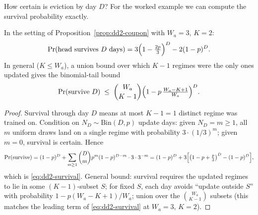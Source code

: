 How certain is eviction by day $D$? For the worked example we can compute the
survival probability exactly.

\begin{proposition}
\label{prop:dd2-survival}
In the setting of Proposition~\ref{prop:dd2-coupon} with $W_a = 3$, $K = 2$:
\begin{equation}
\label{eq:dd2-survival}
\Pr(\text{head survives } D \text{ days})
= 3\Bigl(1 - \tfrac{2p}{3}\Bigr)^{D} - 2(1 - p)^{D}.
\end{equation}
In general ($K \le W_a$), a union bound over which $K-1$ regimes were the
only ones updated gives the binomial-tail bound
\[
\Pr(\text{survive } D)
\;\le\; \binom{W_a}{K-1}
\Bigl(1 - p\,\tfrac{W_a - K + 1}{W_a}\Bigr)^{D}.
\]
\end{proposition}

\begin{proof}
Survival through day $D$ means at most $K - 1 = 1$ distinct regime was
trained on. Condition on $N_D \sim \mathrm{Bin}(D, p)$ update days: given
$N_D = m \ge 1$, all $m$ uniform draws land on a single regime with
probability $3 \cdot (1/3)^m$; given $m = 0$, survival is certain. Hence
\[
\Pr(\text{survive})
= (1-p)^D + \sum_{m \ge 1} \binom{D}{m} p^m (1-p)^{D-m} \cdot 3 \cdot 3^{-m}
= (1-p)^D + 3\Bigl[\bigl(1 - p + \tfrac{p}{3}\bigr)^{D} - (1-p)^D\Bigr],
\]
which is \eqref{eq:dd2-survival}. General bound: survival requires the
updated regimes to lie in some $(K-1)$-subset $S$; for fixed $S$, each day
avoids ``update outside $S$'' with probability $1 - p(W_a - K + 1)/W_a$;
union over the $\binom{W_a}{K-1}$ subsets (this matches the leading term of
\eqref{eq:dd2-survival} at $W_a = 3$, $K = 2$).
\end{proof}

